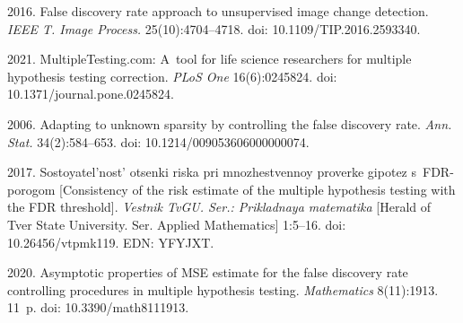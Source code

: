



    




  \begin{multicols}{2}

\renewcommand{\bibname}{\protect\rmfamily References}

{\small\frenchspacing
 {\baselineskip=10.8pt
 \begin{thebibliography}{99} 

 2016. 
False discovery rate approach to unsupervised image change detection. 
\textit{IEEE T. Image Process.} 25(10):4704--4718. doi: 10.1109/TIP.2016.2593340.

 2021. 
MultipleTesting.com: A~tool for life science researchers for multiple hypothesis testing correction. 
\textit{PLoS One} 16(6):0245824. 
doi: 10.1371/journal.pone.0245824.

 2006. 
Adapting to unknown sparsity by controlling the false discovery rate. 
\textit{Ann. Stat.} 34(2):584--653. 
doi: 10.1214/009053606000000074.


 2017.
Sostoyatel'nost' otsenki riska pri mnozhestvennoy proverke gipotez s~FDR-porogom
 [Consistency of the risk estimate of the multiple hypothesis testing with the FDR threshold]. 
\textit{Vestnik TvGU. Ser.: Prikladnaya matematika} [Herald of Tver State University. Ser. Applied Mathematics] 1:5--16.
doi: 10.26456/vtpmk119. EDN: YFYJXT.

 2020. 
Asymptotic properties of MSE estimate for the false discovery rate controlling procedures in multiple hypothesis testing. 
\textit{Mathematics} 8(11):1913. 11~p.
doi: 10.3390/math8111913.


\end{thebibliography}}}
\end{multicols}
